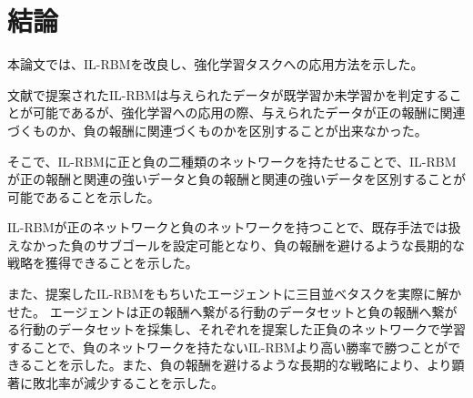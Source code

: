 \chapter{結論}
本論文では、IL-RBMを改良し、強化学習タスクへの応用方法を示した。

文献で提案されたIL-RBMは与えられたデータが既学習か未学習かを判定することが可能であるが、強化学習への応用の際、与えられたデータが正の報酬に関連づくものか、負の報酬に関連づくものかを区別することが出来なかった。

そこで、IL-RBMに正と負の二種類のネットワークを持たせることで、IL-RBMが正の報酬と関連の強いデータと負の報酬と関連の強いデータを区別することが可能であることを示した。

IL-RBMが正のネットワークと負のネットワークを持つことで、既存手法では扱えなかった負のサブゴールを設定可能となり、負の報酬を避けるような長期的な戦略を獲得できることを示した。

また、提案したIL-RBMをもちいたエージェントに三目並べタスクを実際に解かせた。
エージェントは正の報酬へ繋がる行動のデータセットと負の報酬へ繋がる行動のデータセットを採集し、それぞれを提案した正負のネットワークで学習することで、負のネットワークを持たないIL-RBMより高い勝率で勝つことができることを示した。また、負の報酬を避けるような長期的な戦略により、より顕著に敗北率が減少することを示した。